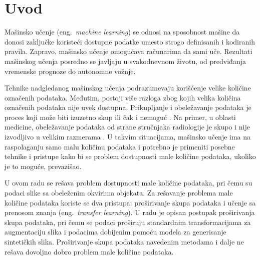 \documentclass[12pt,oneside]{memoir}
\begin{document}
\frontmatter
\naslovna
\komisija
\posveta{}
\apstrakt
\tableofcontents*

\mainmatter


\chapter{Uvod}

Mašinsko učenje (eng.~\textit{machine learning}) se odnosi na sposobnost mašine da donosi zaključke koristeći dostupne podatke umesto strogo definisanih i kodiranih pravila. Zapravo, mašinsko učenje omogućava računarima da sami uče. 
Rezultati mašinskog učenja posredno se javljaju u svakodnevnom životu, od predviđanja vremenske prognoze do autonomne vožnje.

Tehnike nadgledanog mašinskog učenja podrazumevaju korišćenje velike količine označenih podataka. Međutim, postoji više razloga zbog kojih velika količina označenih podataka nije uvek dostupna. Prikupljanje i obeležavanje podataka je proces koji može biti izuzetno skup ili čak i nemoguć \cite{bengio2007scaling}. Na primer, u oblasti medicine, obeležavanje podataka od strane stručnjaka radiologije je skupo i nije izvodljivo u velikim razmerama \cite{litjens2017survey}. U takvim situacijama, mašinsko učenje ima na raspolaganju samo malu količinu podataka i potrebno je primeniti posebne tehnike i pristupe kako bi se problem dostupnosti male količine podataka, ukoliko je to moguće, prevazišao. 

U ovom radu se rešava problem dostupnosti male količine podataka, pri čemu su podaci slike sa obeleženim okvirima objekata. Za rešavanje problema male količine podataka koriste se dva pristupa: proširivanje skupa podataka i učenje sa prenosom znanja (eng.~\textit{transfer learning}).
U radu je opisan postupak proširivanja skupa podataka, pri čemu se podaci proširuju standardnim transformacijama za augmentaciju slika i podacima dobijenim pomoću modela za generisanje sintetičkih slika.
Proširivanje skupa podataka navedenim metodama i dalje ne rešava dovoljno dobro problem male količine podataka.
\end{document}
